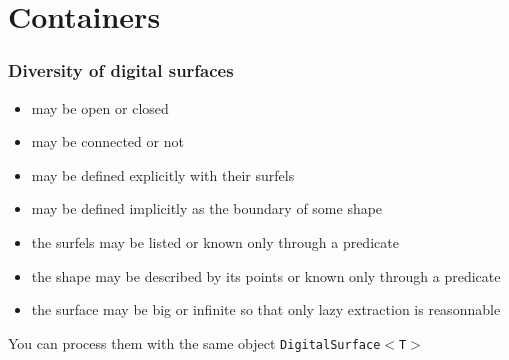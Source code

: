 \documentclass[pdftex,francais]{beamer}
\begin{document}
\section{Containers}
\begin{frame}[squeeze]%
  \frametitle{Diversity of digital surfaces}

  \begin{itemize}
  \item may be open or closed
  \item may be connected or not
  \item may be defined explicitly with their surfels
  \item may be defined implicitly as the boundary of some shape
  \item the surfels may be listed or known only through a predicate
  \item the shape may be described by its points or known only through a predicate
  \item the surface may be big or infinite so that only lazy extraction is reasonnable
  \end{itemize}

  You can process them with the same object {\tt \alert{DigitalSurface}$<$T$>$}
\end{frame}
\end{document}
